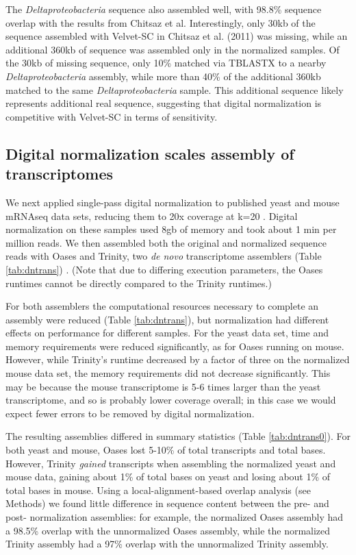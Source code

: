\documentclass{pnastwo}
\begin{document}
\begin{article}
The {\em Deltaproteobacteria} sequence also assembled well, with
98.8\% sequence overlap with the results from Chitsaz et al.
Interestingly, only 30kb of the sequence assembled with Velvet-SC in
Chitsaz et al. (2011) was missing, while an additional 360kb of
sequence was assembled only in the normalized samples.  Of the 30kb of
missing sequence, only 10\% matched via TBLASTX to a nearby {\em
  Deltaproteobacteria} assembly, while more than 40\% of the
additional 360kb matched to the same {\em Deltaproteobacteria} sample.
This additional sequence likely represents additional real
sequence, suggesting that digital normalization is competitive with
Velvet-SC in terms of sensitivity.


\subsection{Digital normalization scales assembly of transcriptomes}

We next applied single-pass digital normalization to published yeast
and mouse mRNAseq data sets, reducing them to 20x coverage at k=20
\cite{pubmed21572440}.  Digital normalization on these samples used
8gb of memory and took about 1 min per million reads.  We then
assembled both the original and normalized sequence reads with Oases
and Trinity, two {\em de novo} transcriptome assemblers (Table
\ref{tab:dntrans}) \cite{pubmed22368243,pubmed21572440}.  (Note that
due to differing execution parameters, the Oases runtimes cannot be
directly compared to the Trinity runtimes.)

For both assemblers the computational resources necessary to complete
an assembly were reduced (Table \ref{tab:dntrans}), but normalization
had different effects on performance for different samples.  For the
yeast data set, time and memory requirements were reduced
significantly, as for Oases running on mouse.  However, while
Trinity's runtime decreased by a factor of three on the normalized
mouse data set, the memory requirements did not decrease
significantly.  This may be because the mouse transcriptome is 5-6
times larger than the yeast transcriptome, and so is probably lower
coverage overall; in this case we would expect fewer errors to be removed
by digital normalization.

The resulting assemblies differed in summary statistics (Table
\ref{tab:dntrans0}).  For both yeast and mouse, Oases lost 5-10\% of
total transcripts and total bases.  However, Trinity {\em gained}
transcripts when assembling the normalized yeast and mouse data,
gaining about 1\% of total bases on yeast and losing about 1\%
of total bases in mouse.  Using a local-alignment-based overlap
analysis (see Methods) we found little difference in sequence
content between the pre- and post- normalization assemblies: for
example, the normalized Oases assembly had a 98.5\% overlap with the
unnormalized Oases assembly, while the normalized Trinity assembly had
a 97\% overlap with the unnormalized Trinity assembly.


\end{article}
\end{document}
